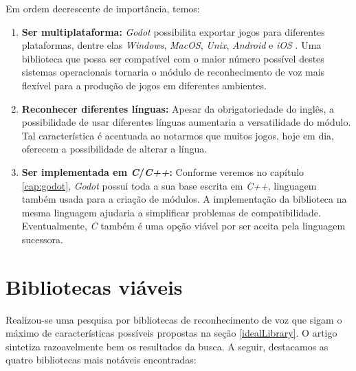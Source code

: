 Em ordem decrescente de importância, temos:

\begin{enumerate}
\item \textbf{Ser multiplataforma:} \textit{Godot} possibilita exportar jogos para diferentes plataformas, dentre elas \textit{Windows}, \textit{MacOS}, \textit{Unix}, \textit{Android} e \textit{iOS} \citep{godotDeployPlatforms}. Uma biblioteca que possa ser compatível com o maior número possível destes sistemas operacionais tornaria o módulo de reconhecimento de voz mais flexível para a produção de jogos em diferentes ambientes.

\item \textbf{Reconhecer diferentes línguas:} Apesar da obrigatoriedade do inglês, a possibilidade de usar diferentes línguas aumentaria a versatilidade do módulo. Tal característica é acentuada ao notarmos que muitos jogos, hoje em dia, oferecem a possibilidade de alterar a língua.

\item \textbf{Ser implementada em \textit{C}/\textit{C++}:} Conforme veremos no capítulo \ref{cap:godot}, \textit{Godot} possui toda a sua base escrita em \textit{C++}, linguagem também usada para a criação de módulos. A implementação da biblioteca na mesma linguagem ajudaria a simplificar problemas de compatibilidade. Eventualmente, \textit{C} também é uma opção viável por ser aceita pela linguagem sucessora.
\end{enumerate}


\section{Bibliotecas viáveis}

Realizou-se uma pesquisa por bibliotecas de reconhecimento de voz que sigam o máximo de características possíveis propostas na seção \ref{idealLibrary}. O artigo \citep{sttLibs} sintetiza razoavelmente bem os resultados da busca. A seguir, destacamos as quatro bibliotecas mais notáveis encontradas:

